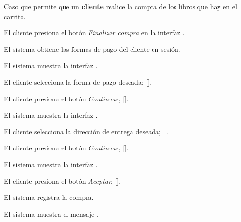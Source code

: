 %
%

{
  Caso que permite que un \textbf{cliente} realice la compra de los libros que
  hay en el carrito.

  \begin{trayectoriaPrincipal}

    \item El cliente presiona el botón \textit{Finalizar compra} en la
      interfaz .

    \item El sistema obtiene las formas de pago del cliente en sesión.

    \item El sistema muestra la interfaz
      .

    \item El cliente selecciona la forma de pago deseada;
      [].

    \item El cliente presiona el botón \textit{Continuar};
      [].

    \item El sistema muestra la interfaz
      .

    \item El cliente selecciona la dirección de entrega deseada;
      [].

    \item El cliente presiona el botón \textit{Continuar};
      [].

    \item El sistema muestra la interfaz
      .

    \item El cliente presiona el botón \textit{Aceptar};
      [].


    \item El sistema registra la compra.

    \item El sistema muestra el mensaje
      .


\end{trayectoriaPrincipal}}
